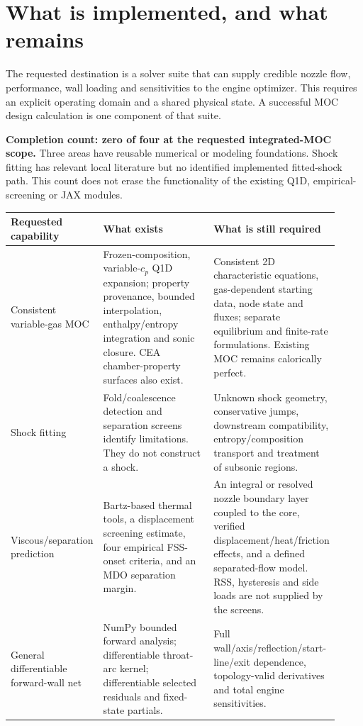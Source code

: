 \section{What is implemented, and what remains}
\label{sec:status}

The requested destination is a solver suite that can supply credible nozzle
flow, performance, wall loading and sensitivities to the engine optimizer.
This requires an explicit operating domain and a shared physical state. A
successful MOC design calculation is one component of that suite.

\textbf{Completion count: zero of four at the requested integrated-MOC scope.}
Three areas have reusable numerical or modeling foundations. Shock fitting
has relevant local literature but no identified implemented fitted-shock
path. This count does not erase the functionality of the existing Q1D,
empirical-screening or JAX modules.

\begin{longtable}{@{}P{0.20\linewidth}P{0.36\linewidth}P{0.36\linewidth}@{}}
\toprule
\textbf{Requested capability} & \textbf{What exists} & \textbf{What is still required}\\\midrule
\endhead
Consistent variable-gas MOC &
Frozen-composition, variable-\(c_p\) Q1D expansion; property provenance,
bounded interpolation, enthalpy/entropy integration and sonic closure.
CEA chamber-property surfaces also exist. &
Consistent 2D characteristic equations, gas-dependent starting data,
node state and fluxes; separate equilibrium and finite-rate formulations.
Existing MOC remains calorically perfect.\\
Shock fitting &
Fold/coalescence detection and separation screens identify limitations.
They do not construct a shock. &
Unknown shock geometry, conservative jumps, downstream compatibility,
entropy/composition transport and treatment of subsonic regions.\\
Viscous/separation prediction &
Bartz-based thermal tools, a displacement screening estimate, four empirical
FSS-onset criteria, and an MDO separation margin. &
An integral or resolved nozzle boundary layer coupled to the core,
verified displacement/heat/friction effects, and a defined separated-flow
model. RSS, hysteresis and side loads are not supplied by the screens.\\
General differentiable forward-wall net &
NumPy bounded forward analysis; differentiable throat-arc kernel;
differentiable selected residuals and fixed-state partials. &
Full wall/axis/reflection/start-line/exit dependence, topology-valid
derivatives and total engine sensitivities.\\
\bottomrule
\end{longtable}

